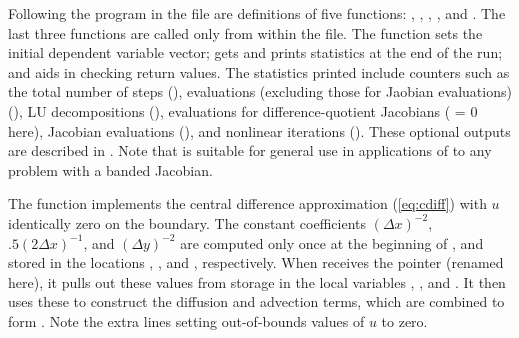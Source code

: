 Following the  program in the  file are definitions of
five functions: , , , , and
.   The last three functions are called only from within the
 file.  The  function sets the initial dependent variable
vector;  gets and prints statistics at the end of the run;
and  aids in checking return values.  The statistics
printed include counters such as the total number of steps (), 
 evaluations (excluding those for Jaobian evaluations) (),
LU decompositions (),  evaluations for
difference-quotient Jacobians ( = 0 here),
Jacobian evaluations (), and nonlinear iterations ().
These optional outputs are described in .
Note that  is suitable for general use in applications
of {\cvode} to any problem with a banded Jacobian.

The  function implements the central difference approximation
(\ref{eq:cdiff}) with $u$ identically zero on the boundary. 
The constant coefficients $(\Delta x)^{-2}$, $.5(2 \Delta x)^{-1}$, and 
$(\Delta y)^{-2}$ are computed only once at the beginning of , 
and stored in the locations , , and
, respectively.   When  receives the 
pointer (renamed  here), it pulls out these values from storage
in the local variables , , and .  It then
uses these to construct the diffusion and advection terms, which are
combined to form .  Note the extra lines setting out-of-bounds
values of $u$ to zero.

